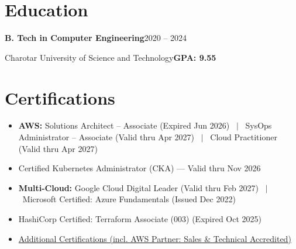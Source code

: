 \documentclass[a4paper,10.999999pt]{article}
\begin{document}
    
    \section{Education}
    
    \noindent\textbf{B. Tech in Computer Engineering}\hfill{2020 -- 2024}\par
    \noindent Charotar University of Science and Technology\hfill{\textbf{GPA: 9.55}}\par

    
    \section{Certifications}

    \begin{itemize}[leftmargin=1.35em, itemsep=0.35pt, topsep=0.3pt, parsep=0pt, label=\raisebox{0.25ex}{\tiny$\circ$}]
    \item \textbf{AWS:} Solutions Architect – Associate (Expired Jun 2026) \ $|$ \ SysOps Administrator – Associate (Valid thru Apr 2027) \ $|$ \ Cloud Practitioner (Valid thru Apr 2027)
    \item Certified Kubernetes Administrator (CKA) — Valid thru Nov 2026
    \item \textbf{Multi-Cloud:} Google Cloud Digital Leader (Valid thru Feb 2027) \ $|$ \ Microsoft Certified: Azure Fundamentals (Issued Dec 2022)
    \item HashiCorp Certified: Terraform Associate (003) (Expired Oct 2025)
    \item \href{https://www.credly.com/users/kelvi-manavadaria}{Additional Certifications (incl. AWS Partner: Sales \& Technical Accredited)}
    \end{itemize}

    
\end{document}

